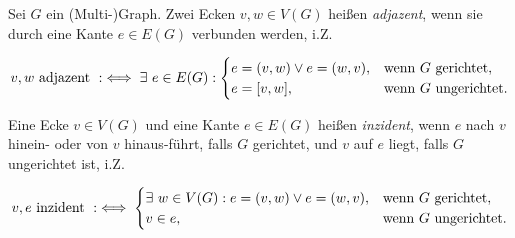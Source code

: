         \begin{definition}

            Sei $G$ ein (Multi-)Graph.
            Zwei Ecken $v, w \in V(G)$ heißen \textit{adjazent}, wenn sie durch eine Kante $e \in E(G)$ verbunden werden, i.Z.

            \begin{align*}
                v, w ~\text{adjazent}~
                :\iff
                \exists ~ e \in E(G):
                    \begin{cases}
                        e = (v, w) \lor e = (w, v), & \text{wenn} ~ G ~ \text{gerichtet},   \\
                        e = [v, w],                 & \text{wenn} ~ G ~ \text{ungerichtet}. \\
                    \end{cases}
            \end{align*}

            Eine Ecke $v \in V(G)$ und eine Kante $e \in E(G)$ heißen \textit{inzident}, wenn $e$ nach $v$ hinein- oder von $v$ hinaus-führt, falls $G$ gerichtet, und $v$ auf $e$ liegt, falls $G$ ungerichtet ist, i.Z.

            \begin{align*}
                v, e ~\text{inzident}~
                :\iff
                \begin{cases}
                    \exists ~ w \in V(G): e = (v, w) \lor e = (w, v), & \text{wenn} ~ G ~ \text{gerichtet},   \\
                    v \in e,                                        & \text{wenn} ~ G ~ \text{ungerichtet}. \\
                \end{cases}
            \end{align*}

        \end{definition}

